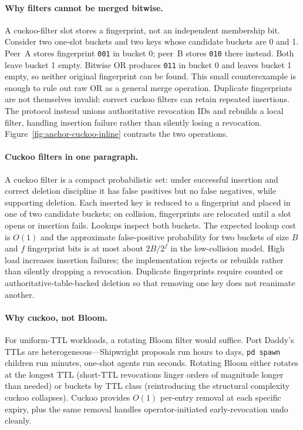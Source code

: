 \documentclass[11pt,a4paper]{article}
\theoremstyle{definition}
\begin{document}
\paragraph{Why filters cannot be merged bitwise.} A cuckoo-filter slot stores
a fingerprint, not an independent membership bit. Consider two one-slot
buckets and two keys whose candidate buckets are 0 and 1. Peer~A stores
fingerprint \texttt{001} in bucket 0; peer~B stores \texttt{010} there instead.
Both leave bucket 1 empty. Bitwise OR produces \texttt{011} in bucket 0 and
leaves bucket 1 empty, so neither original fingerprint can be found. This
small counterexample is enough to rule out raw OR as a general merge operation.
Duplicate fingerprints are not themselves invalid: correct cuckoo filters
can retain repeated insertions. The protocol instead unions authoritative
revocation IDs and rebuilds a local filter, handling insertion failure rather
than silently losing a revocation. Figure~\ref{fig:anchor-cuckoo-inline}
contrasts the two operations.

\paragraph{Cuckoo filters in one paragraph.} A cuckoo filter is a compact probabilistic set: under successful insertion and correct deletion discipline it has false positives but no false negatives, while supporting deletion. Each inserted key is reduced to a fingerprint and placed in one of two candidate buckets; on collision, fingerprints are relocated until a slot opens or insertion fails. Lookups inspect both buckets. The expected lookup cost is $O(1)$ and the approximate false-positive probability for two buckets of size $B$ and $f$ fingerprint bits is at most about $2B/2^f$ in the low-collision model. High load increases insertion failures; the implementation rejects or rebuilds rather than silently dropping a revocation. Duplicate fingerprints require counted or authoritative-table-backed deletion so that removing one key does not reanimate another.



\paragraph{Why cuckoo, not Bloom.} For uniform-TTL workloads, a rotating Bloom filter would suffice. Port Daddy's TTLs are heterogeneous---Shipwright proposals run hours to days, \texttt{pd spawn} children run minutes, one-shot agents run seconds. Rotating Bloom either rotates at the longest TTL (short-TTL revocations linger orders of magnitude longer than needed) or buckets by TTL class (reintroducing the structural complexity cuckoo collapses). Cuckoo provides $O(1)$ per-entry removal at each specific expiry, plus the same removal handles operator-initiated early-revocation undo cleanly.
\end{document}

